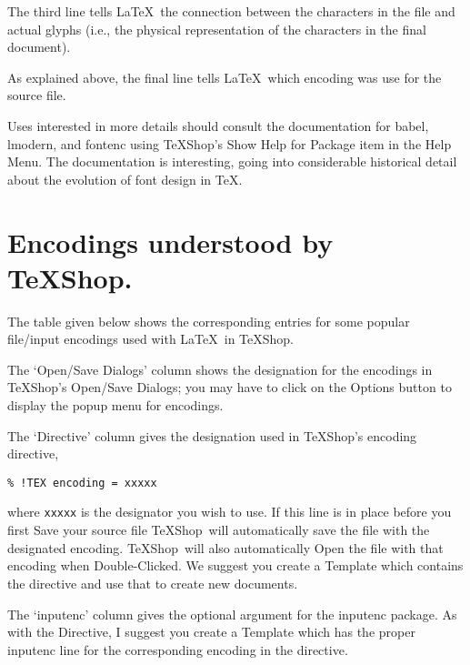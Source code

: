 \documentclass[letterpaper,11pt]{article}
\newcommand{\TS}{\textsf{\TeX Shop}}
\newcommand{\cmd}[1]{\textsf{#1}}
\begin{document}
The third line tells \LaTeX\ the connection between the characters in the file and actual glyphs (i.e., the physical representation of the characters in the final document).

As explained above, the final line tells \LaTeX\ which encoding was use for the source file.

Uses interested in more details should consult the documentation for \cmd{babel}, \cmd{lmodern},
and \cmd{fontenc} using \TS's \cmd{Show Help for Package} item in the \cmd{Help} Menu. The documentation
is interesting, going into considerable historical detail about the evolution of font design in \TeX.



\section{Encodings understood by \TS.}\label{thetable}

The table given below shows the corresponding entries for some popular file/input encodings used with \LaTeX\ in \TS.

The `Open/Save Dialogs' column shows the designation for the encodings in \TS's Open/Save Dialogs; you may have to click on the \cmd{Options} button to display the popup menu for encodings. 

The `Directive' column gives the designation used in \TS's encoding directive,
\begin{verbatim}
% !TEX encoding = xxxxx
\end{verbatim}
where \texttt{xxxxx} is the designator you wish to use. If this line is in place before you first \cmd{Save} your source file \TS\ will automatically save the file with the designated encoding. \TS\ will also automatically \cmd{Open} the file with that encoding when \cmd{Double-Clicked}. We suggest you create a Template which contains the directive and use that to create new documents.

The `inputenc' column gives the optional argument for the inputenc package. As with the Directive, I suggest you create a Template which has the proper inputenc line for the corresponding encoding in the directive.
\end{document}
